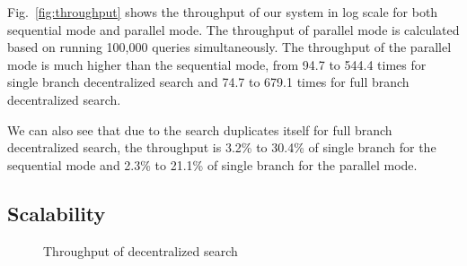 Fig.~\ref{fig:throughput} shows the throughput of our system in log scale for both sequential mode and parallel mode. The throughput of parallel mode is calculated based on running 100,000 queries simultaneously. The throughput of the parallel mode is much higher than the sequential mode, from 94.7 to 544.4 times for single branch decentralized search and 74.7 to 679.1 times for full branch decentralized search. 

We can also see that due to the search duplicates itself for full branch decentralized search, the throughput is 3.2\% to 30.4\% of single branch for the sequential mode and 2.3\% to 21.1\% of single branch for the parallel mode. 

\subsection{Scalability}
\label{eval_scalability}

%

\begin{figure}[ht]
		\vspace{-0.2cm}
    \centering
    \caption{Throughput of decentralized search}
\end{figure}

